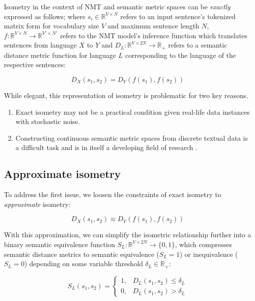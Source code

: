 \documentclass[11pt,a4paper]{article}
\begin{document}
Isometry in the context of NMT and semantic metric spaces can be \textit{exactly} expressed as follows; where $s_i \in \mathbb{R}^{V \times N}$ refers to an input sentence's tokenized matrix form for vocabulary size $V$ and maximum sentence length $N$, $f: \mathbb{R}^{V \times N} \to \mathbb{R}^{V' \times N'}$ refers to the NMT model's inference function which translates sentences from language $X$ to $Y$ and $D_L: \mathbb{R}^{V \times 2N} \to \mathbb{R}_+$ refers to a semantic distance metric function for language $L$ corresponding to the language of the respective sentences:

\begin{equation}  
  \label{exact_isometry_eqn}
  D_X(s_1,s_2) = D_Y(f(s_1),f(s_2))
\end{equation}

While elegant, this representation of isometry is problematic for two key reasons.

\begin{enumerate}
\item Exact isometry may not be a practical condition given real-life data instances with stochastic noise.
\item Constructing continuous semantic metric spaces from discrete textual data is a difficult task and is in itself a developing field of research \cite{cer2017semeval, michel2019evaluation}.
\end{enumerate}

\subsection{Approximate isometry}

To address the first issue, we loosen the constraints of exact isometry to \textit{approximate} isometry:

\begin{equation} 
  \label{approx_isometry_eqn}
  D_X(s_1,s_2) \approx D_Y(f(s_1),f(s_2)) 
\end{equation}

With this approximation, we can simplify the isometric relationship further into a binary semantic equivalence function $S_L: \mathbb{R}^{V \times 2N} \to \{0,1\}$, which compresses semantic distance metrics to semantic equivalence ($S_L=1$) or inequivalence ($S_L=0$) depending on some variable threshold $\delta_L \in \mathbb{R}_+$:

\begin{equation}
  \label{bounded_isometry_eqn}
  S_L(s_1,s_2) =
  \begin{cases}
    1, &D_L(s_1,s_2) \leq \delta_L \\
    0, &D_L(s_1,s_2) > \delta_L
  \end{cases}
\end{equation}
\end{document}
